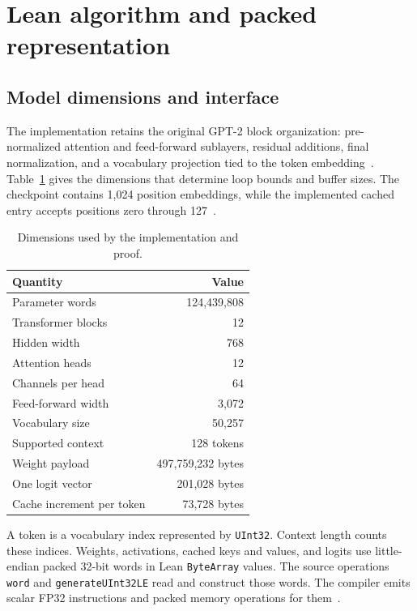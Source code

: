 \documentclass[11pt]{article}
\newcommand{\code}[1]{\texttt{#1}}
\begin{document}
\section{Lean algorithm and packed representation}

\subsection{Model dimensions and interface}

The implementation retains the original GPT-2 block organization: pre-normalized attention and feed-forward sublayers, residual additions, final normalization, and a vocabulary projection tied to the token embedding~\cite{gpt2}.  Table~\ref{tab:shape} gives the dimensions that determine loop bounds and buffer sizes.  The checkpoint contains 1,024 position embeddings, while the implemented cached entry accepts positions zero through 127~\cite{manifest,cached}.

\begin{table}[ht]
\centering
\begin{tabular}{lr}
\toprule
Quantity & Value\\
\midrule
Parameter words & 124,439,808\\
Transformer blocks & 12\\
Hidden width & 768\\
Attention heads & 12\\
Channels per head & 64\\
Feed-forward width & 3,072\\
Vocabulary size & 50,257\\
Supported context & 128 tokens\\
Weight payload & 497,759,232 bytes\\
One logit vector & 201,028 bytes\\
Cache increment per token & 73,728 bytes\\
\bottomrule
\end{tabular}
\caption{Dimensions used by the implementation and proof.}
\label{tab:shape}
\end{table}

A token is a vocabulary index represented by \code{UInt32}.  Context length counts these indices.  Weights, activations, cached keys and values, and logits use little-endian packed 32-bit words in Lean \code{ByteArray} values.  The source operations \code{word} and \code{generateUInt32LE} read and construct those words.  The compiler emits scalar FP32 instructions and packed memory operations for them~\cite{kernels,packed}.
\end{document}
